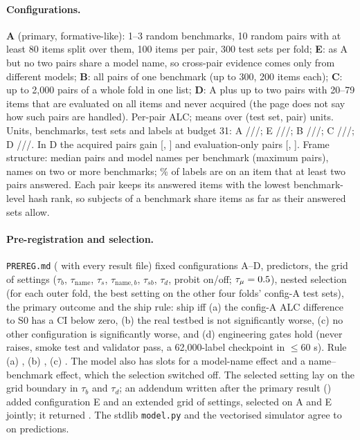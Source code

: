 \documentclass{article}
\begin{document}
\paragraph{Configurations.} \textbf{A} (primary, formative-like): 1--3 random benchmarks, 10 random pairs with at least 80 items split over them, 100 items per pair, 300 test sets per fold; \textbf{E}: as A but no two pairs share a model name, so cross-pair evidence comes only from different models; \textbf{B}: all pairs of one benchmark (up to 300, 200 items each); \textbf{C}: up to 2,000 pairs of a whole fold in one list; \textbf{D}: A plus up to two pairs with 20--79 items that are evaluated on all items and never acquired (the page does not say how such pairs are handled). Per-pair ALC; means over (test set, pair) units. Units, benchmarks, test sets and labels at budget 31: A \XpCANUnits/\XpCANBench/\XpCANTestsets/\XpCANLabels; E \XpCENUnits/\XpCENBench/\XpCENTestsets/\XpCENLabels; B \XpCBNUnits/\XpCBNBench/\XpCBNTestsets/\XpCBNLabels; C \XpCCNUnits/\XpCCNBench/\XpCCNTestsets/\XpCCNLabels; D \XpCDNUnits/\XpCDNBench/\XpCDNTestsets/\XpCDNLabels. In D the acquired pairs gain \XpCDAcquiredMean{} [\XpCDAcquiredLo, \XpCDAcquiredHi] and evaluation-only pairs \XpCDEvalOnlyMean{} [\XpCDEvalOnlyLo, \XpCDEvalOnlyHi]. Frame structure: median \XpFrPairsPerBenchMedian{} pairs and \XpFrNamesPerBenchMedian{} model names per benchmark (maximum \XpFrPairsPerBenchMax{} pairs), \XpFrNamesMulti{} names on two or more benchmarks; \XpFrItemShared\% of labels are on an item that at least two pairs answered. Each pair keeps its \XpFrMaxItems{} answered items with the lowest benchmark-level hash rank, so subjects of a benchmark share items as far as their answered sets allow.

\paragraph{Pre-registration and selection.} \texttt{PREREG.md} (\XpPreregConsistent{} with every result file) fixed configurations A--D, predictors, the grid of \XpGridN{} settings ($\tau_b$, $\tau_{\mathrm{name}}$, $\tau_s$, $\tau_{\mathrm{name},b}$, $\tau_{sb}$, $\tau_d$, probit on/off; $\tau_\mu=0.5$), nested selection (for each outer fold, the best setting on the other four folds' config-A test sets), the primary outcome and the ship rule: ship iff (a) the config-A ALC difference to S0 has a CI below zero, (b) the real testbed is not significantly worse, (c) no other configuration is significantly worse, and (d) engineering gates hold (never raises, smoke test and validator pass, a 62,000-label checkpoint in $\le$60 s). Rule (a) \XpRuleA, (b) \XpRuleB, (c) \XpRuleC. The model also has slots for a model-name effect and a name--benchmark effect, which the selection switched off. The selected setting lay on the grid boundary in $\tau_b$ and $\tau_d$; an addendum written after the primary result (\XpAddendumConsistent) added configuration E and an extended grid of \XpGridExtN{} settings, selected on A and E jointly; it returned \XpRobSameAsPrereg. The stdlib \texttt{model.py} and the vectorised simulator agree to \XpEquivMaxDiff{} on \XpEquivN{} predictions.
\end{document}
